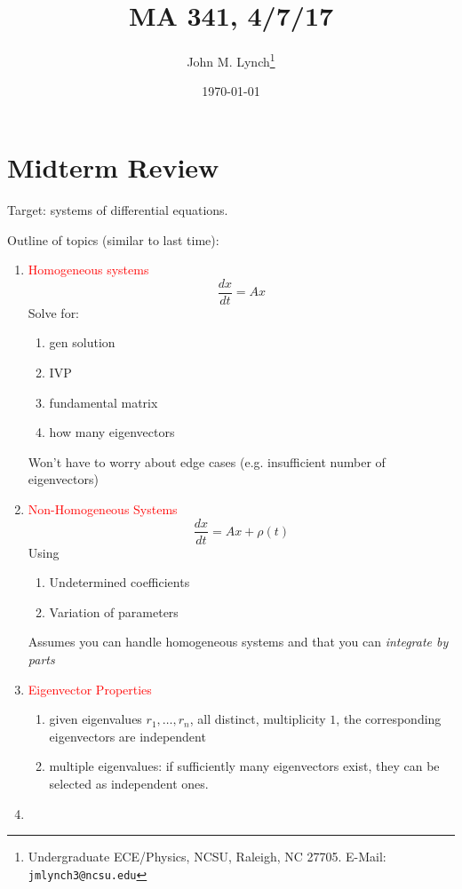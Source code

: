 \documentclass[twocolumn,draft]{article}
\title{MA 341, 4/7/17}
\author{John M. Lynch\footnote{Undergraduate ECE/Physics, NCSU, Raleigh, NC 27705. E-Mail: \texttt{jmlynch3@ncsu.edu}}}
\date{\today}
\newcommand{\rt}[1]{\textcolor{red}{#1}}
\begin{document}
  \maketitle
  
  \section*{Midterm Review}
  
  Target: systems of differential equations.
  
  Outline of topics (similar to last time):
  
  \begin{enumerate}
	  
  	\item \rt{Homogeneous systems}
		\begin{equation*}
			\frac{dx}{dt}= Ax
		\end{equation*}
		Solve for:
		\begin{enumerate}
			\item gen solution
			\item IVP
			\item fundamental matrix
			\item how many eigenvectors
		\end{enumerate}
		Won't have to worry about edge cases (e.g. insufficient number of eigenvectors)
		
	\item \rt{Non-Homogeneous Systems}
		\begin{equation*}
			\frac{dx}{dt} = Ax + \rho(t)
		\end{equation*}
		Using
		\begin{enumerate}
			\item Undetermined coefficients
			\item Variation of parameters
		\end{enumerate}
		Assumes you can handle homogeneous systems and that you can \emph{integrate by parts}
		
	\item \rt{Eigenvector Properties}
		\begin{enumerate}
			\item given eigenvalues $r_{1}, \ldots, r_{n}$, all distinct, multiplicity $1$,
				the corresponding eigenvectors are independent
			\item multiple eigenvalues: if sufficiently many eigenvectors exist, they can be
				selected as independent ones.
		\end{enumerate}
	
	\item 
  \end{enumerate}
  
\end{document}
